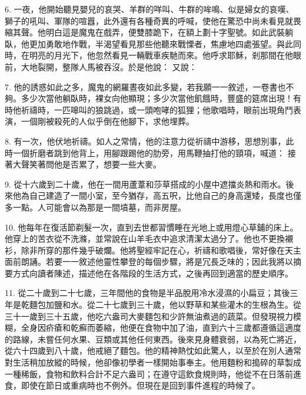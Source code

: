 6. 一夜，他開始聽見嬰兒的哀哭、羊群的咩叫、牛群的哞鳴、似是婦女的哀嘆、獅子的吼叫、軍隊的喧囂，此外還有各種奇異的呼喊，使他在驚恐中尚未看見就畏縮其聲。他明白這是魔鬼在戲弄，便雙膝跪下，在額上劃十字聖號。如此武裝躺臥，他更加勇敢地作戰，半渴望看見那些他聽來戰慄者，焦慮地四處張望。與此同時，在明亮的月光下，他忽然看見一輛戰車疾馳而來。他呼求耶穌，剎那間在他眼前，大地裂開，整隊人馬被吞沒。於是他說：  又說：\par

7. 他的誘惑如此之多，魔鬼的網羅晝夜如此多變，若我願一一敘述，一卷書也不夠。多少次當他躺臥時，裸女向他顯現；多少次當他飢餓時，豐盛的筵席出現！有時他祈禱時，一匹嗥叫的狼跳過，或一頭咆哮的狐狸；他歌唱時，眼前出現角鬥表演，一個剛被殺死的人似乎倒在他腳下，求他埋葬。\par

8. 有一次，他伏地祈禱。如人之常情，他的注意力從祈禱中游移，思想別事，此時一個折磨者跳到他背上，用腳跟踢他的肋旁，用馬鞭抽打他的頸項，喊道： 接著大聲笑著問他是否累了，想要一些大麥。\par

9. 從十六歲到二十歲，他在一間用蘆葦和莎草搭成的小屋中遮擋炎熱和雨水。後來他為自己建造了一間小室，至今猶存，高五呎，比他自己的身高還矮，長度也僅多一點。人可能會以為那是一間墳墓，而非房屋。\par

10. 他每年在復活節剃髮一次，直到去世都習慣睡在光地上或用燈心草鋪的床上。他穿上的苦衣從不洗滌，並常說在山羊毛衣中追求清潔太過分了。他也不更換襯衫，除非所穿的那件幾乎破爛。他將聖經牢記在心，祈禱和歌唱後，常好像在天主面前朗誦。若要一一敘述他靈性攀登的每個步驟，將是冗長乏味的；因此我將以摘要方式向讀者陳述，描述他在各階段的生活方式，之後再回到適當的歷史順序。\par

11. 從二十歲到二十七歲，三年間他的食物是半品脫用冷水浸濕的小扁豆；其後三年是乾麵包加鹽和水。從二十七歲到三十歲，他以野草和某些灌木的生根為生。從三十一歲到三十五歲，他吃六盎司大麥麵包和少許無油煮過的蔬菜。但發現視力模糊，全身因疥瘡和乾癬而萎縮，他便在食物中加了油，直到六十三歲都遵循這適度的路線，未嘗任何水果、豆類或其他任何東西。後來見身體衰弱，以為死亡將近，從六十四歲到八十歲，他戒絕了麵包。他的精神熱忱如此驚人，以至於在別人通常對生活稍加放縱的時候，他卻像初學者一樣開始事奉主。他用麵粉和搗碎的草製成一種稀飯，食物和飲料合計不足六盎司；在遵守這飲食規則時，他從不在日落前進食，即使在節日或重病時也不例外。但現在是回到事件進程的時候了。\par

